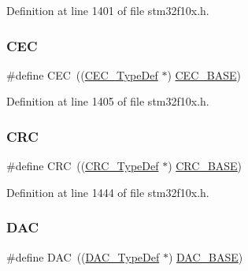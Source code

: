 Definition at line 1401 of file stm32f10x.\+h.

\mbox{\label{group___peripheral__declaration_ga7d03f4d873d59ff8bc76b6c9b576f3e3}} 
\subsubsection{\texorpdfstring{C\+EC}{CEC}}
{\footnotesize\ttfamily \#define C\+EC~((\hyperlink{struct_c_e_c___type_def}{C\+E\+C\+\_\+\+Type\+Def} $\ast$) \hyperlink{group___peripheral__memory__map_gaacb77bc44b3f8c87ab98f241e760e440}{C\+E\+C\+\_\+\+B\+A\+SE})}



Definition at line 1405 of file stm32f10x.\+h.

\mbox{\label{group___peripheral__declaration_ga4381bb54c2dbc34500521165aa7b89b1}} 
\subsubsection{\texorpdfstring{C\+RC}{CRC}}
{\footnotesize\ttfamily \#define C\+RC~((\hyperlink{struct_c_r_c___type_def}{C\+R\+C\+\_\+\+Type\+Def} $\ast$) \hyperlink{group___peripheral__memory__map_ga656a447589e785594cbf2f45c835ad7e}{C\+R\+C\+\_\+\+B\+A\+SE})}



Definition at line 1444 of file stm32f10x.\+h.

\mbox{\label{group___peripheral__declaration_ga4aa2a4ab86ce00c23035e5cee2e7fc7e}} 
\subsubsection{\texorpdfstring{D\+AC}{DAC}}
{\footnotesize\ttfamily \#define D\+AC~((\hyperlink{struct_d_a_c___type_def}{D\+A\+C\+\_\+\+Type\+Def} $\ast$) \hyperlink{group___peripheral__memory__map_gad18d0b914c7f68cecbee1a2d23a67d38}{D\+A\+C\+\_\+\+B\+A\+SE})}



